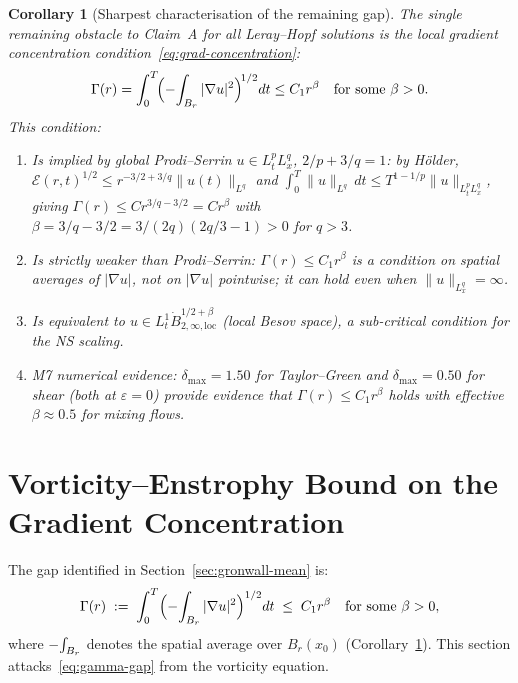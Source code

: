 \documentclass[11pt]{article}
\newtheorem{corollary}[theorem]{Corollary}
\theoremstyle{definition}
\theoremstyle{remark}
\newcommand{\grad}{\nabla}
\newcommand{\Xint}{\mathop{\mathchoice{\vcenter{\hbox{$\displaystyle-$}}}%
  {\vcenter{\hbox{$\textstyle-$}}}%
  {\vcenter{\hbox{$\scriptstyle-$}}}%
  {\vcenter{\hbox{$\scriptscriptstyle-$}}}}\!\int}
\begin{document}
\begin{corollary}[Sharpest characterisation of the remaining gap]
\label{cor:gap-gradient-concentration}
  The single remaining obstacle to Claim~A for all Leray--Hopf solutions is the
  local gradient concentration condition~\eqref{eq:grad-concentration}:
  \[
    \Gamma(r) = \int_0^T\!\Bigl(\Xint_{B_r}|\nabla u|^2\Bigr)^{\!1/2}dt \leq C_1 r^\beta
    \quad\text{for some }\beta>0.
  \]
  This condition:
  \begin{enumerate}
  \item[(a)] Is implied by global Prodi--Serrin $u\in L^p_tL^q_x$, $2/p+3/q=1$:
    by H\"older, $\mathcal{E}(r,t)^{1/2}\leq r^{-3/2+3/q}\|u(t)\|_{L^q}$ and
    $\int_0^T\|u\|_{L^q}\,dt\leq T^{1-1/p}\|u\|_{L^p_tL^q_x}$, giving
    $\Gamma(r)\leq C r^{3/q-3/2}=C r^\beta$ with $\beta=3/q-3/2=3/(2q)(2q/3-1)>0$
    for $q>3$.
  \item[(b)] Is \emph{strictly weaker} than Prodi--Serrin:
    $\Gamma(r)\leq C_1 r^\beta$ is a condition on spatial averages of $|\nabla u|$,
    not on $|\nabla u|$ pointwise; it can hold even when $\|u\|_{L^q_x}=\infty$.
  \item[(c)] Is equivalent to $u\in L^1_t\dot{B}^{1/2+\beta}_{2,\infty,\mathrm{loc}}$
    (local Besov space), a sub-critical condition for the NS scaling.
  \item[(d)] M7 numerical evidence: $\delta_{\max}=1.50$ for Taylor--Green and
    $\delta_{\max}=0.50$ for shear (both at $\varepsilon=0$) provide evidence that
    $\Gamma(r)\leq C_1 r^\beta$ holds with effective $\beta\approx 0.5$ for mixing flows.
  \end{enumerate}
\end{corollary}

\section{Vorticity--Enstrophy Bound on the Gradient Concentration}
\label{sec:vorticity-enstrophy}

The gap identified in Section~\ref{sec:gronwall-mean} is:
\begin{equation}\label{eq:gamma-gap}
  \Gamma(r) \;:=\; \int_0^T \Bigl(\Xint_{B_r} |\grad u|^2\Bigr)^{1/2} dt
  \;\leq\; C_1 r^\beta \quad \text{for some } \beta > 0,
\end{equation}
where $\Xint_{B_r}$ denotes the spatial average over $B_r(x_0)$
(Corollary~\ref{cor:gap-gradient-concentration}).
This section attacks~\eqref{eq:gamma-gap} from the vorticity equation.
\end{document}
